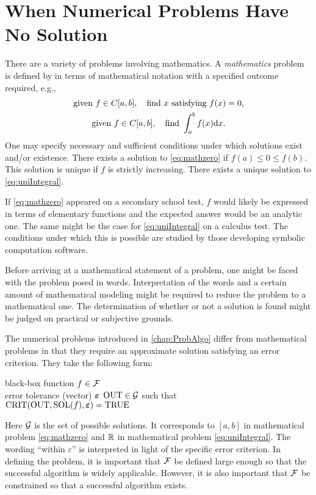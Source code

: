\chapter{When Numerical Problems Have No Solution} \label{chap:NoSolution}

There are a variety of problems involving mathematics.  A \emph{mathematics} problem is defined by in terms of mathematical notation with a specified outcome required, e.g., 
\begin{gather}\label{eq:mathzero}
    \text{given } f \in C[a,b],  \quad \text{find } x \text{ satisfying } f(x) = 0, \\
    \label{eq:uniIntegral}
    \text{given } f \in C[a,b],  \quad \text{find } \int_a^b f(x) {\rm d} x.
\end{gather} 
One may specify necessary and sufficient conditions under which solutions exist and/or existence.  There exists a solution to \eqref{eq:mathzero} if $f(a) \le 0 \le f(b)$.  This solution is unique if $f$ is strictly increasing.  There exists a unique solution to \eqref{eq:uniIntegral}.

If \eqref{eq:mathzero} appeared on a secondary school test, $f$ would likely be expressed in terms of elementary functions and the expected answer would be an analytic one.  The same might be the case for \eqref{eq:uniIntegral} on a calculus test.  The conditions under which this is possible are studied by those developing symbolic computation software.  

Before arriving at a mathematical statement of a problem, one might be faced with the problem posed in words.  Interpretation of the words and a certain amount of mathematical modeling might be required to reduce the problem to a mathematical one.  The determination of whether or not a solution is found might be judged on practical or subjective grounds.

The numerical problems introduced in \cref{chap:ProbAlgo} differ from mathematical problems in that they require an approximate solution satisfying an error criterion.  They take the following form:
\begin{NumProblem}
\label{prob:generalProblem}
{black-box function $f \in \mathcal{F}$ \\ error tolerance (vector) $\boldsymbol{\varepsilon}$}
{$\operatorname{OUT} \in \mathcal{G}$ such that \\ \qquad $\operatorname{CRIT}(\operatorname{OUT},\operatorname{SOL}(f),\boldsymbol{\varepsilon}) = \textup{TRUE}$}
\end{NumProblem}
Here $\mathcal{G}$ is the set of possible solutions.  It corresponds to $[a,b]$ in mathematical problem \eqref{eq:mathzero} and $\mathbb{R}$ in mathematical problem \eqref{eq:uniIntegral}.  The wording ``within $\varepsilon$'' is interpreted in light of the specific error criterion.
In defining the problem, it is important that $\mathcal{F}$ be defined large enough so that the successful algorithm is widely applicable.  However, it is also important that $\mathcal{F}$ be constrained so that a successful algorithm exists.  

